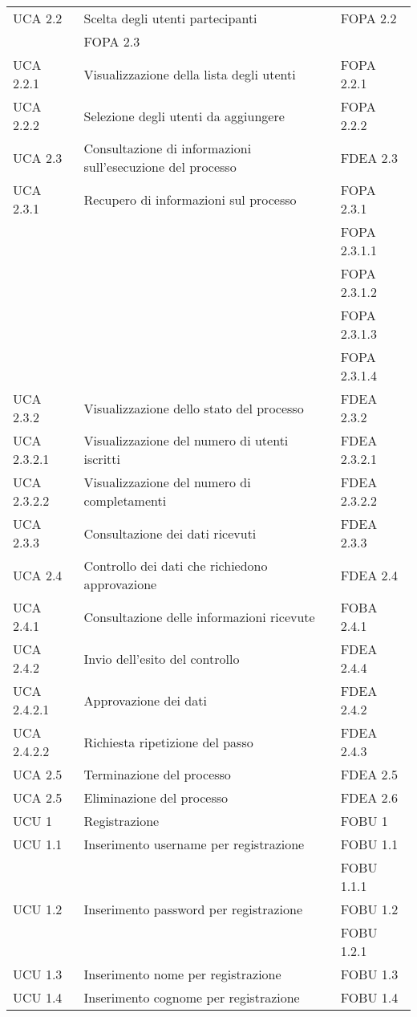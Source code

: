 \begin{longtable}{lXp{}}
\midrule
UCA 2.2&Scelta degli utenti partecipanti&FOPA 2.2\\
&FOPA 2.3\\
\midrule
UCA 2.2.1&Visualizzazione della lista degli utenti&FOPA 2.2.1\\
\midrule
UCA 2.2.2&Selezione degli utenti da aggiungere&FOPA 2.2.2\\
\midrule
UCA 2.3&Consultazione di informazioni sull'esecuzione del processo&FDEA 2.3\\
\midrule
UCA 2.3.1&Recupero di informazioni sul processo&FOPA 2.3.1\\
&&FOPA 2.3.1.1\\
&&FOPA 2.3.1.2\\
&&FOPA 2.3.1.3\\
&&FOPA 2.3.1.4\\
\midrule
UCA 2.3.2&Visualizzazione dello stato del processo&FDEA 2.3.2\\
\midrule
UCA 2.3.2.1&Visualizzazione del numero di utenti iscritti&FDEA 2.3.2.1\\
\midrule
UCA 2.3.2.2&Visualizzazione del numero di completamenti&FDEA 2.3.2.2\\
\midrule
UCA 2.3.3&Consultazione dei dati ricevuti&FDEA 2.3.3\\
\midrule
UCA 2.4&Controllo dei dati che richiedono approvazione&FDEA 2.4\\
\midrule
UCA 2.4.1&Consultazione delle informazioni ricevute&FOBA 2.4.1\\
\midrule
UCA 2.4.2&Invio dell'esito del controllo&FDEA 2.4.4\\
\midrule
UCA 2.4.2.1&Approvazione dei dati&FDEA 2.4.2\\
\midrule
UCA 2.4.2.2&Richiesta ripetizione del passo&FDEA 2.4.3\\
\midrule
UCA 2.5&Terminazione del processo&FDEA 2.5\\
\midrule
UCA 2.5&Eliminazione del processo&FDEA 2.6\\
\midrule 
UCU 1&Registrazione&FOBU 1\\ 
\midrule 
UCU 1.1&Inserimento username per registrazione&FOBU 1.1\\ 
&&FOBU 1.1.1\\
\midrule 
UCU 1.2&Inserimento password per registrazione&FOBU 1.2\\ 
&&FOBU 1.2.1\\ 
\midrule 
UCU 1.3&Inserimento nome per registrazione&FOBU 1.3\\ 
\midrule 
UCU 1.4&Inserimento cognome per registrazione&FOBU 1.4\\ 

\end{longtable}
